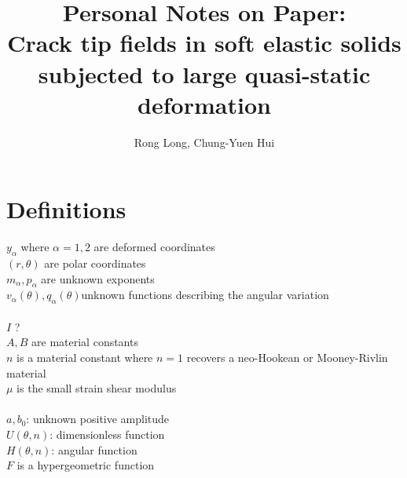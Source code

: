 \documentclass[12pt,3p]{article}
\numberwithin{equation}{section}
\begin{document}
\title{Personal Notes on Paper: \\
	\large{Crack tip fields in soft elastic solids subjected to large quasi-static deformation}}
\author{Rong Long, Chung-Yuen Hui}
\date{\vspace{-5ex}}
\maketitle

\tableofcontents
\newpage

\section{Definitions}
$y_\alpha$ where $\alpha = 1, 2$ are deformed coordinates \\
$(r, \theta)$ are polar coordinates \\
$m_{\alpha}, p_{\alpha}$ are unknown exponents \\
$v_{\alpha} (\theta), q_{\alpha} (\theta)$unknown functions describing the angular variation \\ \\
$I$ ? \\
$A, B$ are material constants \\
$n$ is a material constant where $n = 1$ recovers a neo-Hookean or Mooney-Rivlin material \\
$\mu$ is the small strain shear modulus \\ \\
$a, b_0$: unknown positive amplitude \\
$U (\theta, n)$: dimensionless function \\
$H (\theta, n)$: angular function \\
$F$ is a hypergeometric function \\ 

\end{document}
